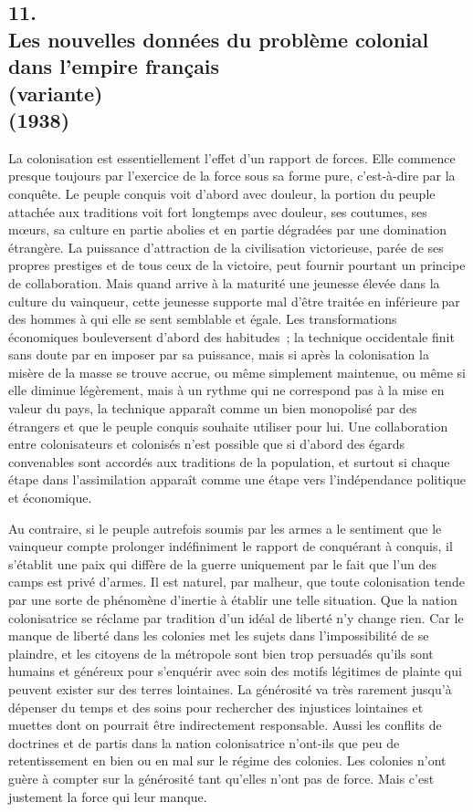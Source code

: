 \documentclass[french,twoside]{book} %
\begin{document}
\subsection[{11. Les nouvelles données du problème colonial dans l'empire français, (variante) (1938)}]{11. \\
Les nouvelles données du problème colonial dans l'empire français \\
(variante) \\
(1938)}
\noindent \par
La colonisation est essentiellement l'effet d'un rapport de forces. Elle commence presque toujours par l'exercice de la force sous sa forme pure, c'est-à-dire par la conquête. Le peuple conquis voit d'abord avec douleur, la portion du peuple attachée aux traditions voit fort longtemps avec douleur, ses coutumes, ses mœurs, sa culture en partie abolies et en partie dégradées par une domination étrangère. La puissance d'attraction de la civilisation victo­rieuse, parée de ses propres prestiges et de tous ceux de la victoire, peut fournir pourtant un principe de collaboration. Mais quand arrive à la maturité une jeunesse élevée dans la culture du vainqueur, cette jeunesse supporte mal d'être traitée en inférieure par des hommes à qui elle se sent semblable et égale. Les transformations économiques bouleversent d'abord des habitudes ; la technique occidentale finit sans doute par en imposer par sa puissance, mais si après la colonisation la misère de la masse se trouve accrue, ou même simplement maintenue, ou même si elle diminue légèrement, mais à un rythme qui ne correspond pas à la mise en valeur du pays, la technique apparaît comme un bien monopolisé par des étrangers et que le peuple conquis souhaite utiliser pour lui. Une collaboration entre colonisateurs et colonisés n'est possible que si d'abord des égards convenables sont accordés aux tradi­tions de la population, et surtout si chaque étape dans l'assimilation apparaît comme une étape vers l'indépendance politique et économique.\par
Au contraire, si le peuple autrefois soumis par les armes a le sentiment que le vainqueur compte prolonger indéfiniment le rapport de conquérant à conquis, il s'établit une paix qui diffère de la guerre uniquement par le fait que l'un des camps est privé d'armes. Il est naturel, par malheur, que toute colonisation tende par une sorte de phénomène d'inertie à établir une telle situation. Que la nation colonisatrice se réclame par tradition d'un idéal de liberté n'y change rien. Car le manque de liberté dans les colonies met les sujets dans l'impossibilité de se plaindre, et les citoyens de la métropole sont bien trop persuadés qu'ils sont humains et généreux pour s'enquérir avec soin des motifs légitimes de plainte qui peuvent exister sur des terres lointaines. La générosité va très rarement jusqu'à dépenser du temps et des soins pour rechercher des injustices lointaines et muettes dont on pourrait être indirec­tement responsable. Aussi les conflits de doctrines et de partis dans la nation colonisatrice n'ont-ils que peu de retentissement en bien ou en mal sur le régime des colonies. Les colonies n'ont guère à compter sur la générosité tant qu'elles n'ont pas de force. Mais c'est justement la force qui leur manque.
\end{document}

